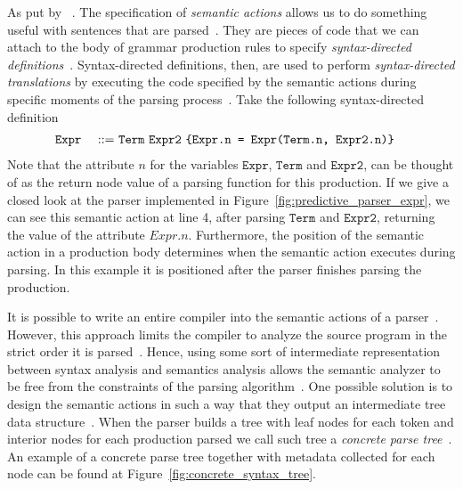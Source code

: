 \documentclass[
  oneside,
  english,
  coorientadorbanca,
  embeddedlogo,
  noabntexcite
]{ufsc-thesis-rn46-2019}
\def\ppp{::=}
\newcommand{\code}[1]{\texttt{#1}}
\newcommand{\bnfvar}[1]{\ \bnfvars{#1}}
\newcommand{\bnfvars}[1]{\code{#1}}
\newcommand{\bnfprod}[2]{\bnfvars{#1} &\ &\ppp& #2}
\begin{document}
As put by~\textcite{appel2003modern} .
The specification of \textit{semantic actions} allows us to do something useful with sentences that are parsed~\cite{appel2003modern}.
They are pieces of code that we can attach to the body of grammar production rules to specify \textit{syntax-directed definitions}~\cite{Aho:2006:CPT:1177220}.
Syntax-directed definitions, then, are used to perform \textit{syntax-directed translations} by executing the code specified by the semantic actions during specific moments of the parsing process~\cite{Aho:2006:CPT:1177220}.
Take the following syntax-directed definition
\begin{alignat}{2}
  \bnfprod{Expr}{\bnfvar{Term} \bnfvar{Expr2}\ \text{\code{\{Expr.n = Expr(Term.n, Expr2.n)\}}}} \label{eq:sdd_example}
\end{alignat}
Note that the attribute $n$ for the variables $\bnfvars{Expr}$, $\bnfvars{Term}$ and $\bnfvars{Expr2}$, can be thought of as the return node value of a parsing function for this production.
If we give a closed look at the parser implemented in Figure~\ref{fig:predictive_parser_expr}, we can see this semantic action at line 4, after parsing $\bnfvars{Term}$ and $\bnfvars{Expr2}$, returning the value of the attribute $Expr.n$.
Furthermore, the position of the semantic action in a production body determines when the semantic action executes during parsing.
In this example it is positioned after the parser finishes parsing the production.

It is possible to write an entire compiler into the semantic actions of a parser~\cite{appel2003modern}.
However, this approach limits the compiler to analyze the source program in the strict order it is parsed~\cite{appel2003modern}.
Hence, using some sort of intermediate representation between syntax analysis and semantics analysis allows the semantic analyzer to be free from the constraints of the parsing algorithm~\cite{appel2003modern}.
One possible solution is to design the semantic actions in such a way that they output an intermediate tree data structure~\cite{appel2003modern}.
When the parser builds a tree with leaf nodes for each token and interior nodes for each production parsed we call such tree a \textit{concrete parse tree}~\cite{appel2003modern}.
An example of a concrete parse tree together with metadata collected for each node can be found at Figure~\ref{fig:concrete_syntax_tree}.
\end{document}
